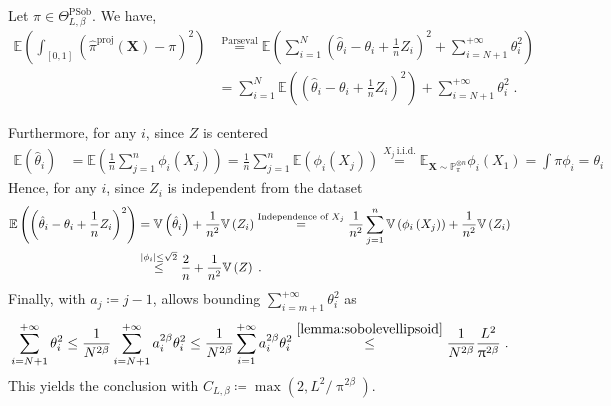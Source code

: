 \documentclass[10pt]{article} %
\newcommand{\Prob}[0]{\mathbb{P}}
\newcommand{\E}[0]{\mathbb{E}}
\newcommand{\V}[0]{\mathbb{V}}
\newcommand\vect[1]{\mathbf{#1}}
\newcommand\p[1]{\left( {#1}\right)}
\newcommand\B[1]{{#1}}
\begin{document}
Let $\pi \in \Theta^{\text{PSob}}_{L, \beta}$.
    We have, 
    \begin{equation*}
    \begin{aligned}
         \E \p{ \int_{[0, 1]} \p{\hat{\pi}^{\text{proj}}(\vect{X}) - \pi}^2}
         & \stackrel{\text{Parseval}}{=}
          \E \p{ \sum_{i=1}^N \p{\hat{\theta}_i -\theta_i + \frac{1}{n} Z_i}^2 + \sum_{i=N+1}^{+\infty} \theta_i^2 } \\
          & \stackrel{\text{}}{=}
           \sum_{i=1}^N \E \p{\p{\hat{\theta}_i -\theta_i + \frac{1}{n} Z_i}^2} + \sum_{i=N+1}^{+\infty} \theta_i^2 \;.
    \end{aligned}
    \end{equation*}

Furthermore, for any $i$, since $Z$ is centered
\begin{equation*}
    \begin{aligned}
        \E \p{\hat{\theta}_i} 
        &= 
        \E \p{\frac{1}{n} \sum_{j=1}^n \phi_i(X_j)}
        =
        \frac{1}{n} \sum_{j=1}^n \E \p{\phi_i(X_j)} 
        \stackrel{X_j\ \mathrm{i.i.d.}}{=} \E_{\vect{X} \sim \Prob_{\pi}^{\otimes n}} \phi_i(X_1) = \int \pi \phi_i = \theta_i
    \end{aligned}
\end{equation*}
Hence, for any $i$, since $Z_i$ is independent from the dataset
\begin{equation*}
    \begin{aligned}
        \E \p{\p{\hat{\theta}_i -\theta_i + \frac{1}{n} Z_i}^2}
        &= 
        \V \p{\hat{\theta}_i} + \frac{1}{n^2} \V \p{Z_i} 
        \stackrel{\text{Independence of $X_j$}}{=}
        \frac{1}{n^2} \sum_{j=1}^n \V \p{\phi_i \p{X_j}} + \frac{1}{n^2} \V \p{Z_i} \\
        &\stackrel{|\phi_i| \leq \sqrt{2}}{\leq}
        \frac{%
        2}{n}+ \frac{1}{n^2} \V \p{Z} \;.
    \end{aligned}
\end{equation*}
Finally, with $a_j \coloneqq j-1$,  allows bounding $\sum_{i=m+1}^{+\infty} \theta_i^2$ as
\begin{equation*}
    \sum_{i=N+1}^{+\infty} \theta_i^2 \leq \frac{1}{N^{2 \beta}} \sum_{i=N+1}^{+\infty} a_i^{2\beta} \theta_i^2 \leq \frac{1}{N^{2 \beta}} \sum_{i=1}^{+\infty} a_i^{2\beta} \theta_i^2 \stackrel{\Cref{lemma:sobolevellipsoid}}{\leq} \frac{1}{N^{2 \beta}} \frac{L^2}{\B{\uppi}^{2 \beta}} \;.
\end{equation*}
This yields the conclusion with $C_{L,\beta} \coloneqq \max(2, L^2/\B{\uppi}^{2\beta})$.
\end{document}
